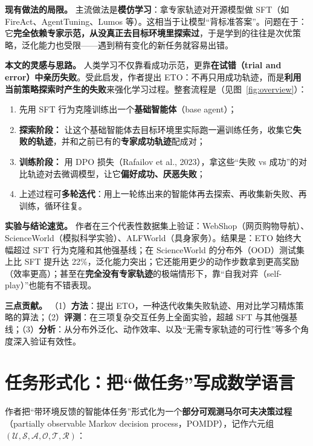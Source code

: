 \documentclass[11pt,UTF8,fontset=fandol]{ctexart}
\begin{document}
\textbf{现有做法的局限。} 主流做法是\textbf{模仿学习}：拿专家轨迹对开源模型做 SFT（如 FireAct、AgentTuning、Lumos 等）。这相当于让模型“背标准答案”。问题在于：它\textbf{完全依赖专家示范，从没真正去目标环境里探索过}，于是学到的往往是次优策略，泛化能力也受限——遇到稍有变化的新任务就容易出错。

\textbf{本文的灵感与思路。} 人类学习不仅靠看成功示范，更靠\textbf{在试错（trial and error）中亲历失败}。受此启发，作者提出 ETO：不再只用成功轨迹，而是\textbf{利用当前策略探索时产生的失败}来强化学习过程。整套流程是（见图~\ref{fig:overview}）：

\begin{enumerate}[leftmargin=2em]
\item 先用 SFT 行为克隆训练出一个\textbf{基础智能体}（base agent）；
\item \textbf{探索阶段：} 让这个基础智能体去目标环境里实际跑一遍训练任务，收集它\textbf{失败的轨迹}，并和之前已有的\textbf{专家成功轨迹}配成对；
\item \textbf{训练阶段：} 用 DPO 损失（Rafailov et al., 2023），拿这些“失败 vs 成功”的对比轨迹对去微调模型，让它\textbf{偏好成功、厌恶失败}；
\item 上述过程可\textbf{多轮迭代}：用上一轮练出来的智能体再去探索、再收集新失败、再训练，循环往复。
\end{enumerate}

\textbf{实验与结论速览。} 作者在三个代表性数据集上验证：WebShop（网页购物导航）、ScienceWorld（模拟科学实验）、ALFWorld（具身家务）。结果是：ETO 始终大幅超过 SFT 行为克隆和其他强基线；在 ScienceWorld 的分布外（OOD）测试集上比 SFT 提升达 22\%，泛化能力突出；它还能用更少的动作步数拿到更高奖励（效率更高）；甚至在\textbf{完全没有专家轨迹}的极端情形下，靠“自我对弈（self-play）”也能有不错表现。

\textbf{三点贡献。} （1）\textbf{方法}：提出 ETO，一种迭代收集失败轨迹、用对比学习精炼策略的算法；（2）\textbf{评测}：在三项复杂交互任务上全面实验，超越 SFT 与其他强基线；（3）\textbf{分析}：从分布外泛化、动作效率、以及“无需专家轨迹的可行性”等多个角度深入验证有效性。

\section{任务形式化：把“做任务”写成数学语言}

作者把“带环境反馈的智能体任务”形式化为一个\textbf{部分可观测马尔可夫决策过程}（partially observable Markov decision process，POMDP），记作六元组 $(\mathcal{U}, \mathcal{S}, \mathcal{A}, \mathcal{O}, \mathcal{T}, \mathcal{R})$：
\end{document}
